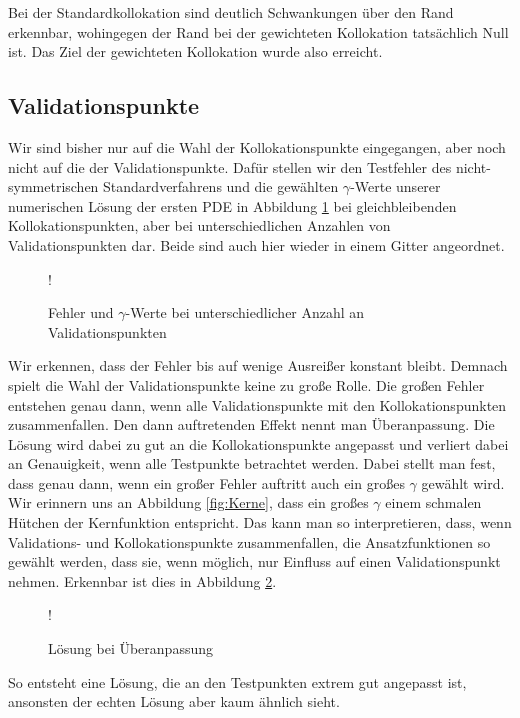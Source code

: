 Bei der Standardkollokation sind deutlich Schwankungen über den Rand erkennbar, wohingegen der Rand bei der gewichteten Kollokation tatsächlich Null ist. Das Ziel der gewichteten Kollokation wurde also erreicht.

\subsection{Validationspunkte}
Wir sind bisher nur auf die Wahl der Kollokationspunkte eingegangen, aber noch nicht auf die der Validationspunkte. Dafür stellen wir den Testfehler des nicht-symmetrischen Standardverfahrens und die gewählten $\gamma$-Werte unserer numerischen Lösung der ersten \ac{PDE} in Abbildung \ref{fig:testpunkte} bei gleichbleibenden Kollokationspunkten, aber bei unterschiedlichen Anzahlen von Validationspunkten dar. Beide sind auch hier wieder in einem Gitter angeordnet.
\begin{figure}[ht]
\centering
\resizebox {\columnwidth} {!} {

}
\caption{Fehler und $\gamma$-Werte bei unterschiedlicher Anzahl an Validationspunkten}
\label{fig:testpunkte}
\end{figure}
Wir erkennen, dass der Fehler bis auf wenige Ausreißer konstant bleibt. Demnach spielt die Wahl der Validationspunkte keine zu große Rolle. Die großen Fehler entstehen genau dann, wenn alle Validationspunkte mit den Kollokationspunkten zusammenfallen. Den dann auftretenden Effekt nennt man Überanpassung. Die Lösung wird dabei zu gut an die Kollokationspunkte angepasst und verliert dabei an Genauigkeit, wenn alle Testpunkte betrachtet werden. Dabei stellt man fest, dass genau dann, wenn ein großer Fehler auftritt auch ein großes $\gamma$ gewählt wird. Wir erinnern uns an Abbildung \ref{fig:Kerne}, dass ein großes $\gamma$ einem schmalen \glqq Hütchen\grqq{}  der Kernfunktion entspricht. Das kann man so interpretieren, dass, wenn Validations- und Kollokationspunkte zusammenfallen, die Ansatzfunktionen so gewählt werden, dass sie, wenn möglich, nur \glqq Einfluss \grqq{} auf einen Validationspunkt nehmen. Erkennbar ist dies in Abbildung \ref{fig:overfitting}.
\begin{figure}[ht]
\centering
\resizebox {\columnwidth} {!} {

}
\caption{Lösung bei Überanpassung}
\label{fig:overfitting}
\end{figure}
So entsteht eine Lösung, die an den Testpunkten extrem gut angepasst ist, ansonsten der echten Lösung aber kaum ähnlich sieht.

